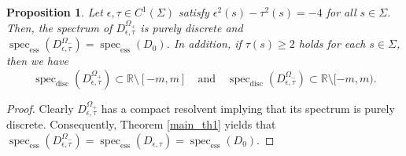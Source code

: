 \documentclass[11pt,a4paper,reqno,oneside]{amsproc}
\DeclareMathOperator{\spec}{spec}
\newcommand{\specd}{\spec_\mathrm{disc}}
\newcommand{\spece}{\spec_\mathrm{ess}}
\def \rr {{\mathbb R}}
\numberwithin{equation}{section}
\newtheorem{proposition}[definition]{Proposition}
\begin{document}
\begin{proposition}\label{Spec_H} Let $\epsilon,\tau\in C^1(\Sigma)$ satisfy $\epsilon^2(s)-\tau^2(s)= -4$ for all $s\in\Sigma$. Then, the spectrum of $D_{\epsilon,\tau}^{\Omega_+}$ is purely discrete and  $\spece(D_{\epsilon,\tau}^{\Omega_-})=\spece(D_0)$. In addition, if $\tau(s)\geq2$ 
holds for each $s\in\Sigma$, then we have
\[
\specd(D_{\epsilon,\tau}^{\Omega_+})\subset \rr\setminus [-m,m] \quad \text{and}\quad \specd(D_{\epsilon,\tau}^{\Omega_-})\subset \rr\setminus [-m,m).
\]
\end{proposition}
\begin{proof} Clearly $D_{\epsilon,\tau}^{\Omega_+}$ has a compact resolvent implying that its spectrum is purely discrete. Consequently, Theorem \ref{main_th1} yields that $\spece(D_{\epsilon,\tau}^{\Omega_-})=\spece(D_{\epsilon,\tau})=\spece(D_0)$.


\end{proof}
\end{document}

